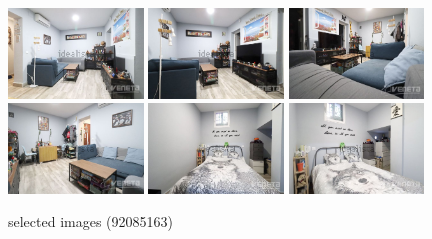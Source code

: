 \documentclass[10pt,a4paper]{report}
\begin{document}
\begin{figure}[htbp]

\includegraphics[width=0.32\textwidth]{arfima/92085163/92085163-001.jpg}
\includegraphics[width=0.32\textwidth]{arfima/92085163/92085163-002.jpg}
\includegraphics[width=0.32\textwidth]{arfima/92085163/92085163-003.jpg}
\includegraphics[width=0.32\textwidth]{arfima/92085163/92085163-004.jpg}
\includegraphics[width=0.32\textwidth]{arfima/92085163/92085163-005.jpg}
\includegraphics[width=0.32\textwidth]{arfima/92085163/92085163-006.jpg}
\caption{selected images (92085163)}
\end{figure}
\end{document}
